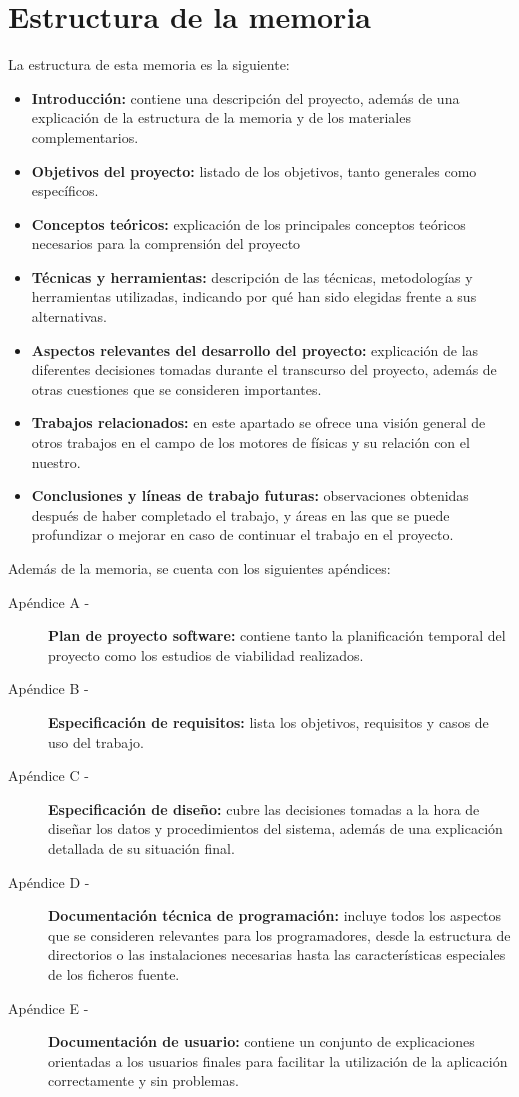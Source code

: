 \section{Estructura de la memoria}
La estructura de esta memoria es la siguiente:
\begin{itemize}
    \item \textbf{Introducción:} contiene una descripción del proyecto, además de una explicación de la estructura de la memoria y de los materiales complementarios.
    \item \textbf{Objetivos del proyecto:} listado de los objetivos, tanto generales como específicos.
    \item \textbf{Conceptos teóricos:} explicación de los principales conceptos teóricos necesarios para la comprensión del proyecto
    \item \textbf{Técnicas y herramientas:} descripción de las técnicas, metodologías y herramientas utilizadas, indicando por qué han sido elegidas frente a sus alternativas.
    \item \textbf{Aspectos relevantes del desarrollo del proyecto:} explicación de las diferentes decisiones tomadas durante el transcurso del proyecto, además de otras cuestiones que se consideren importantes.
    \item \textbf{Trabajos relacionados:} en este apartado se ofrece una visión general de otros trabajos en el campo de los motores de físicas y su relación con el nuestro.
    \item \textbf{Conclusiones y líneas de trabajo futuras:} observaciones obtenidas después de haber completado el trabajo, y áreas en las que se puede profundizar o mejorar en caso de continuar el trabajo en el proyecto.
\end{itemize}

Además de la memoria, se cuenta con los siguientes apéndices:
\begin{description}
    \item[Apéndice A -] \textbf{Plan de proyecto software:} contiene tanto la planificación temporal del proyecto como los estudios de viabilidad realizados.
    \item[Apéndice B -] \textbf{Especificación de requisitos:} lista los objetivos, requisitos y casos de uso del trabajo.
    \item[Apéndice C -] \textbf{Especificación de diseño:} cubre las decisiones tomadas a la hora de diseñar los datos y procedimientos del sistema, además de una explicación detallada de su situación final.
    \item[Apéndice D -] \textbf{Documentación técnica de programación:} incluye todos los aspectos que se consideren relevantes para los programadores, desde la estructura de directorios o las instalaciones necesarias hasta las características especiales de los ficheros fuente.
    \item[Apéndice E -] \textbf{Documentación de usuario:} contiene un conjunto de explicaciones orientadas a los usuarios finales para facilitar la utilización de la aplicación correctamente y sin problemas.
\end{description}


